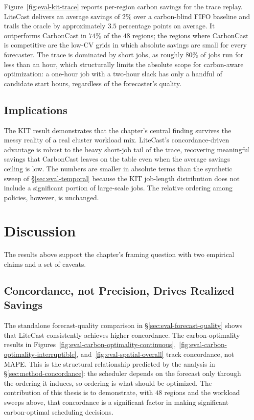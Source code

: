 Figure~\ref{fig:eval-kit-trace} reports per-region carbon savings for the trace replay.
LiteCast delivers an average savings of $2\%$ over a carbon-blind FIFO baseline and trails the oracle by approximately $3.5$ percentage points on average.
It outperforms CarbonCast in $74\%$ of the $48$ regions; the regions where CarbonCast is competitive are the low-CV grids in which absolute savings are small for every forecaster.
The trace is dominated by short jobs, as roughly $80\%$ of jobs run for less than an hour, which structurally limits the absolute scope for carbon-aware optimization: a one-hour job with a two-hour slack has only a handful of candidate start hours, regardless of the forecaster's quality.

\subsection{Implications}
\label{sec:eval-cluster-discussion}

The KIT result demonstrates that the chapter's central finding survives the messy reality of a real cluster workload mix.
LiteCast's concordance-driven advantage is robust to the heavy short-job tail of the trace, recovering meaningful savings that CarbonCast leaves on the table even when the average savings ceiling is low.
The numbers are smaller in absolute terms than the synthetic sweep of \S\ref{sec:eval-temporal} because the KIT job-length distribution does not include a significant portion of large-scale jobs.
The relative ordering among policies, however, is unchanged.

\section{Discussion}
\label{sec:eval-discussion}

The results above support the chapter's framing question with two empirical claims and a set of caveats.

\subsection{Concordance, not Precision, Drives Realized Savings}
\label{sec:eval-discussion-concordance}

The standalone forecast-quality comparison in \S\ref{sec:eval-forecast-quality} shows that LiteCast consistently achieves higher concordance.
The carbon-optimality results in Figures~\ref{fig:eval-carbon-optimality-continuous},~\ref{fig:eval-carbon-optimality-interruptible}, and~\ref{fig:eval-spatial-overall} track concordance, not MAPE.
This is the structural relationship predicted by the analysis in \S\ref{sec:method-concordance}: the scheduler depends on the forecast only through the ordering it induces, so ordering is what should be optimized.
The contribution of this thesis is to demonstrate, with $48$ regions and the workload sweeps above, that concordance is a significant factor in making significant carbon-optimal scheduling decisions.

